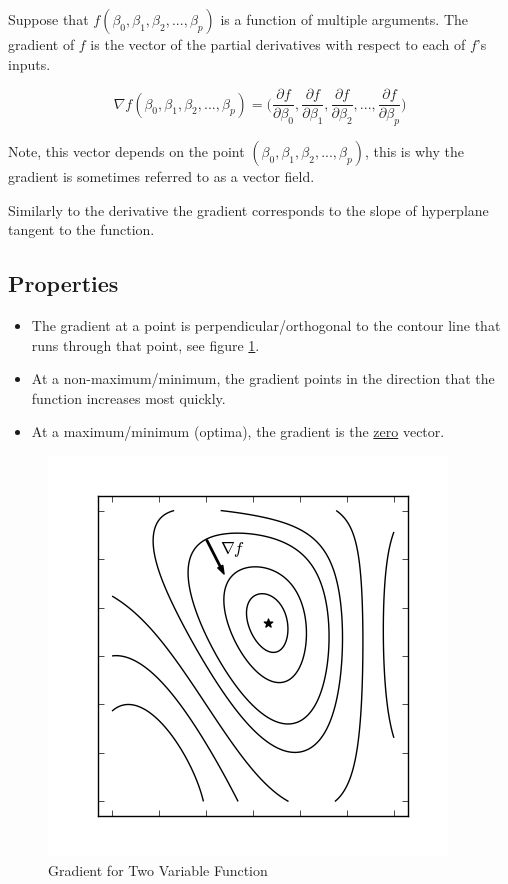 \documentclass[a4paper, 12pt]{article}
\begin{document}
Suppose that $f(\beta_0, \beta_1, \beta_2, ... , \beta_p)$ is a function of multiple arguments. The gradient of $f$ is the vector of the partial derivatives with respect to each of $f$'s inputs.

  $$ \nabla f(\beta_0, \beta_1, \beta_2, ... , \beta_p) = \bigg( \frac{\partial f}{\partial \beta_0}, \frac{\partial f}{\partial \beta_1}, \frac{\partial f}{\partial \beta_2}, ... , \frac{\partial f}{\partial \beta_p} \bigg) $$

Note, this vector depends on the point $(\beta_0, \beta_1, \beta_2, ... , \beta_p)$, this is why the gradient is sometimes referred to as a vector field.

\vspace{1pc}

Similarly to the derivative the gradient corresponds to the slope of hyperplane tangent to the function.

\subsection*{Properties}
\begin{itemize}
  \item The gradient at a point is perpendicular/orthogonal to the contour line that runs through that point, see figure \ref{fig:two_grad}.
  \item At a non-maximum/minimum, the gradient points in the direction that the function increases most quickly. 
  \item At a maximum/minimum (optima), the gradient is the \underline{zero} vector.
\end{itemize}

\begin{figure}[H]
  \centering
    \includegraphics[scale=1]{images/two_var_gradient.png}
  \caption{Gradient for Two Variable Function} \label{fig:two_grad}
\end{figure}
\end{document}
